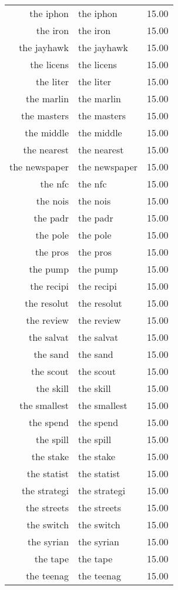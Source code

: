 \begin{table}[ht]
\begin{tabular}{rlr}
  the iphon & the iphon & 15.00 \\ 
  the iron & the iron & 15.00 \\ 
  the jayhawk & the jayhawk & 15.00 \\ 
  the licens & the licens & 15.00 \\ 
  the liter & the liter & 15.00 \\ 
  the marlin & the marlin & 15.00 \\ 
  the masters & the masters & 15.00 \\ 
  the middle & the middle & 15.00 \\ 
  the nearest & the nearest & 15.00 \\ 
  the newspaper & the newspaper & 15.00 \\ 
  the nfc & the nfc & 15.00 \\ 
  the nois & the nois & 15.00 \\ 
  the padr & the padr & 15.00 \\ 
  the pole & the pole & 15.00 \\ 
  the pros & the pros & 15.00 \\ 
  the pump & the pump & 15.00 \\ 
  the recipi & the recipi & 15.00 \\ 
  the resolut & the resolut & 15.00 \\ 
  the review & the review & 15.00 \\ 
  the salvat & the salvat & 15.00 \\ 
  the sand & the sand & 15.00 \\ 
  the scout & the scout & 15.00 \\ 
  the skill & the skill & 15.00 \\ 
  the smallest & the smallest & 15.00 \\ 
  the spend & the spend & 15.00 \\ 
  the spill & the spill & 15.00 \\ 
  the stake & the stake & 15.00 \\ 
  the statist & the statist & 15.00 \\ 
  the strategi & the strategi & 15.00 \\ 
  the streets & the streets & 15.00 \\ 
  the switch & the switch & 15.00 \\ 
  the syrian & the syrian & 15.00 \\ 
  the tape & the tape & 15.00 \\ 
  the teenag & the teenag & 15.00 \\ 

\end{tabular}
\end{table}
